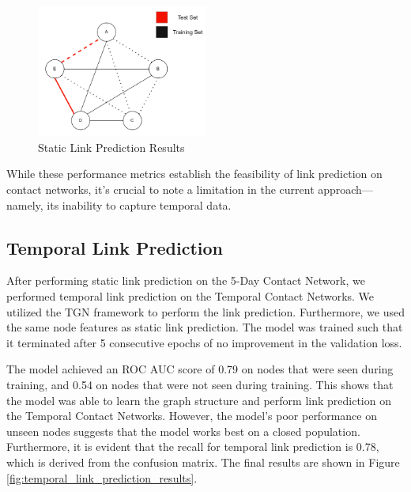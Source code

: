 \documentclass[times, 10pt,twocolumn]{article}
\begin{document}
\begin{figure}[h]
    \centering
    \includegraphics[width=0.5\textwidth]{imgs/static_prediction_data_split.png}
    \caption{Static Link Prediction Results} 
    \label{fig:static_link_prediction_results}
\end{figure}


While these performance metrics establish the feasibility of link prediction on contact networks, it's crucial to note a limitation in the current approach—namely, its inability to capture temporal data. 

\subsection{Temporal Link Prediction}
After performing static link prediction on the 5-Day Contact Network, we performed temporal link prediction on the Temporal Contact Networks. We utilized the TGN framework to perform the link prediction. Furthermore, we used the same node features as static link prediction. The model was trained such that it terminated after 5 consecutive epochs of no improvement in the validation loss.

The model achieved an ROC AUC score of 0.79 on nodes that were seen during training, and 0.54 on nodes that were not seen during training. This shows that the model was able to learn the graph structure and perform link prediction on the Temporal Contact Networks. However, the model's poor performance on unseen nodes suggests that the model works best on a closed population. Furthermore, it is evident that the recall for temporal link prediction is 0.78, which is derived from the confusion matrix. The final results are shown in Figure \ref{fig:temporal_link_prediction_results}.
\end{document}
